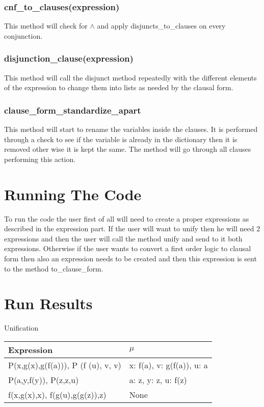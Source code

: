 {\subsubsection{cnf\_to\_clauses(expression)}
This method will check for $\wedge$ and apply disjuncts\_to\_clauses on every conjunction.
\subsubsection{disjunction\_clause(expression)}
This method will call the disjunct method repeatedly with the different elements of the expression to change them into lists as needed by the clausal form.
\subsubsection{clause\_form\_standardize\_apart}
This method will start to rename the variables inside the clauses. It is performed through a check to see if the variable is already in the dictionary then it is removed other wise it is kept the same. The method will go through all clauses performing this action.
\section{Running The Code}
To run the code the user first of all will need to create a proper expressions as described in the expression part. If the user will want to unify then he will need 2 expressions and then the user will call the method unify and send to it both expressions. Otherwise if the user wants to convert a first order logic to clausal form then also an expression needs to be created and then this expression is sent to the method to\_clause\_form.

\section{Run Results}
\begin{center}
Unification
\end{center}
\begin{table}[htb]
\begin{tabular}{| p{7cm}  | p{7cm} | }
 \hline
Expression  & $\mu$
\\ \hline
P(x,g(x),g(f(a))), P (f (u), v, v) & x: f(a), v: g(f(a)), u: a
\\ \hline
P(a,y,f(y)), P(z,z,u) & a: z, y: z, u: f(z)
\\ \hline
f(x,g(x),x), f(g(u),g(g(z)),z) & None
\\ \hline
\end{tabular}
\end{table}

}
